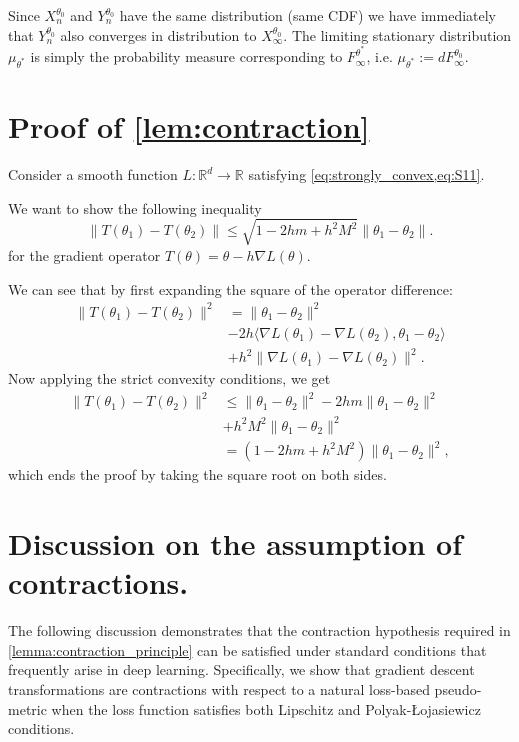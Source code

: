 \documentclass[10pt]{article} %
\theoremstyle{plain}
\theoremstyle{definition}
\theoremstyle{remark}
\begin{document}
Since $X_n^{\theta_0}$ and $Y_n^{\theta_0}$ have the same distribution (same CDF) we have immediately that $Y_n^{\theta_0}$ also converges in distribution to $X_\infty^{\theta_0}$.
The limiting stationary distribution $\mu_{\theta^*}$ is simply the probability measure corresponding to $F_{\infty}^{\theta^*}$, i.e. $\mu_{\theta^*} := dF_{\infty}^{\theta_0}$.


\section{Proof of \cref{lem:contraction}}
\label{appendix:proof_of_contraction}

Consider a smooth function $L:\mathbb{R}^d \to \mathbb{R}$ satisfying \cref{eq:strongly_convex,eq:S11}.

We want to show the following inequality
\begin{equation*}
    \left \| T(\theta_1)-T(\theta_2) \right \| \leq \sqrt{1 - 2 h m + h^2 M^2} \left \| \theta_1-\theta_2 \right \|.
\end{equation*}
for the gradient operator $T(\theta)=\theta-h\nabla L(\theta)$.

We can see that by first expanding the square of the operator difference:
\begin{align*}
    \| T(\theta_1) - T(\theta_2) \|^2 & = \|\theta_1-\theta_2\|^2 \\
    & - 2h \langle \nabla L(\theta_1) - \nabla L(\theta_2), \theta_1-\theta_2 \rangle \\
    & + h^2 \| \nabla L(\theta_1) - \nabla L(\theta_2) \|^2.
\end{align*}
Now applying the strict convexity conditions, we get
\begin{align*}
    \| T(\theta_1) - T(\theta_2) \|^2 & \leq \|\theta_1-\theta_2\|^2 - 2h m \|\theta_1-\theta_2\|^2 \\
    & + h^2 M^2 \|\theta_1-\theta_2\|^2 \\
    & = (1 - 2h m + h^2 M^2) \|\theta_1-\theta_2\|^2,
\end{align*}
which ends the proof by taking the square root on both sides.




\section{Discussion on the assumption of contractions.}
\label{appendix:lossmet}
The following discussion demonstrates that the contraction hypothesis required in \cref{lemma:contraction_principle} can be satisfied under standard conditions that frequently arise in deep learning. Specifically, we show that gradient descent transformations are contractions with respect to a natural loss-based pseudo-metric when the loss function satisfies both Lipschitz and Polyak-Łojasiewicz conditions.
\end{document}

